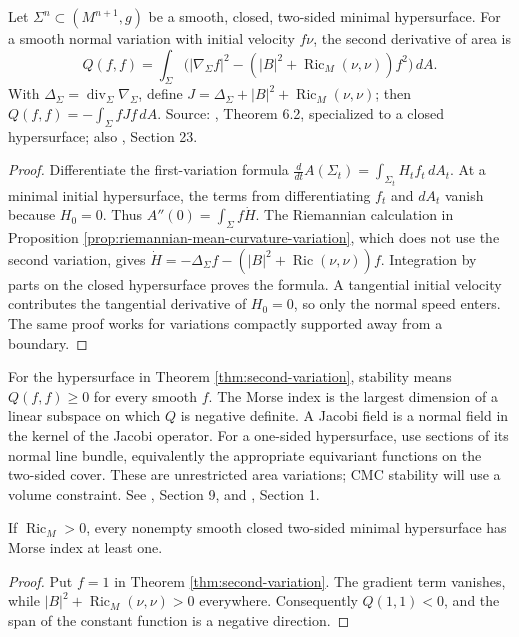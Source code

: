 \begin{theorem}\label{thm:second-variation}
Let $\Sigma^n\subset(M^{n+1},g)$ be a smooth, closed, two-sided minimal hypersurface. For a smooth normal variation with initial velocity $f\nu$, the second derivative of area is
\[
 Q(f,f)=\int_\Sigma\bigl(|\nabla_\Sigma f|^2-(|B|^2+\operatorname{Ric}_M(\nu,\nu))f^2\bigr)\,dA.
\]
With $\Delta_\Sigma=\operatorname{div}_\Sigma\nabla_\Sigma$, define
$J=\Delta_\Sigma+|B|^2+\operatorname{Ric}_M(\nu,\nu)$; then $Q(f,f)=-\int_\Sigma fJf\,dA$.
Source: \cite{MM}, Theorem 6.2, specialized to a closed hypersurface; also \cite{ChMin}, Section 23.
\end{theorem}
\begin{proof}
Differentiate the first-variation formula $\frac d{dt}A(\Sigma_t)=\int_{\Sigma_t}H_tf_t\,dA_t$. At a minimal initial hypersurface, the terms from differentiating $f_t$ and $dA_t$ vanish because $H_0=0$. Thus $A''(0)=\int_\Sigma f\dot H$. The Riemannian calculation in Proposition \ref{prop:riemannian-mean-curvature-variation}, which does not use the second variation, gives $\dot H=-\Delta_\Sigma f-(|B|^2+\operatorname{Ric}(\nu,\nu))f$. Integration by parts on the closed hypersurface proves the formula. A tangential initial velocity contributes the tangential derivative of $H_0=0$, so only the normal speed enters. The same proof works for variations compactly supported away from a boundary.
\end{proof}

\begin{definition}\label{def:morse-index}
For the hypersurface in Theorem \ref{thm:second-variation}, stability means $Q(f,f)\geq0$ for every smooth $f$. The Morse index is the largest dimension of a linear subspace on which $Q$ is negative definite. A Jacobi field is a normal field in the kernel of the Jacobi operator. For a one-sided hypersurface, use sections of its normal line bundle, equivalently the appropriate equivariant functions on the two-sided cover. These are unrestricted area variations; CMC stability will use a volume constraint. See \cite{MM}, Section 9, and \cite{MNIndex}, Section 1.
\end{definition}

\begin{corollary}\label{cor:ricci-unstable}
If $\operatorname{Ric}_M>0$, every nonempty smooth closed two-sided minimal hypersurface has Morse index at least one.
\end{corollary}
\begin{proof}
Put $f=1$ in Theorem \ref{thm:second-variation}. The gradient term vanishes, while $|B|^2+\operatorname{Ric}_M(\nu,\nu)>0$ everywhere. Consequently $Q(1,1)<0$, and the span of the constant function is a negative direction.
\end{proof}

